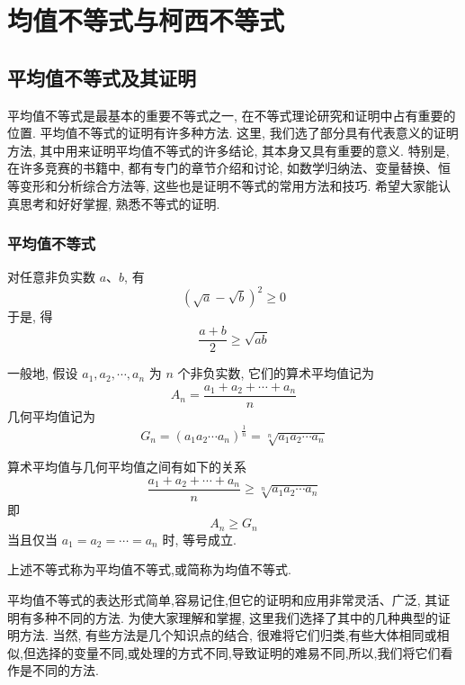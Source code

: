 %
%
%
\chapter{均值不等式与柯西不等式}
\section{平均值不等式及其证明}
平均值不等式是最基本的重要不等式之一, 在不等式理论研究和证明中占有重要的位置. 平均值不等式的证明有许多种方法. 这里, 我们选了部分具有代表意义的证明方法, 其中用来证明平均值不等式的许多结论, 其本身又具有重要的意义. 特别是, 在许多竞赛的书籍中, 都有专门的章节介绍和讨论, 如数学归纳法、变量替换、恒等变形和分析综合方法等, 这些也是证明不等式的常用方法和技巧. 希望大家能认真思考和好好掌握, 熟悉不等式的证明.

\subsection{平均值不等式}
对任意非负实数 $a 、 b$, 有
$$
(\sqrt{a}-\sqrt{b})^{2} \geqslant 0
$$
于是, 得
$$
\frac{a+b}{2} \geqslant \sqrt{a b}
$$

一般地, 假设 $a_{1}, a_{2}, \cdots, a_{n}$ 为 $n$ 个非负实数, 它们的算术平均值记为
$$
A_{n}=\frac{a_{1}+a_{2}+\cdots+a_{n}}{n}
$$
几何平均值记为
$$
G_{n}=\left(a_{1} a_{2} \cdots a_{n}\right)^{\frac{1}{n}}=\sqrt[n]{a_{1} a_{2} \cdots a_{n}}
$$

算术平均值与几何平均值之间有如下的关系
$$
\frac{a_{1}+a_{2}+\cdots+a_{n}}{n} \geqslant \sqrt[n]{a_{1} a_{2} \cdots a_{n}}
$$
即
$$
A_{n} \geqslant G_{n}
$$
当且仅当 $a_{1}=a_{2}=\cdots=a_{n}$ 时, 等号成立.

上述不等式称为平均值不等式,或简称为均值不等式.

平均值不等式的表达形式简单,容易记住,但它的证明和应用非常灵活、广泛, 其证明有多种不同的方法. 为使大家理解和掌握, 这里我们选择了其中的几种典型的证明方法. 当然, 有些方法是几个知识点的结合, 很难将它们归类,有些大体相同或相似,但选择的变量不同,或处理的方式不同,导致证明的难易不同,所以,我们将它们看作是不同的方法.

